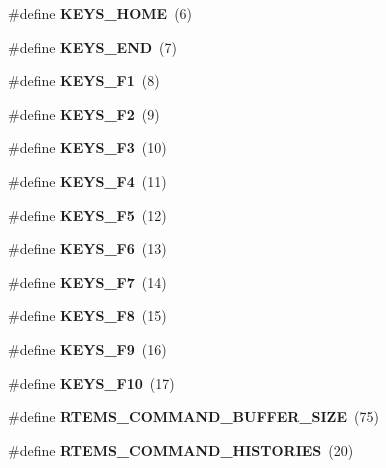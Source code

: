 \begin{DoxyCompactItemize}
\#define {\bfseries K\+E\+Y\+S\+\_\+\+H\+O\+ME}~(6)
\item 
\mbox{\label{mon-editor_8c_a2dfe5eb52c2dddf8574639989b868476}} 
\#define {\bfseries K\+E\+Y\+S\+\_\+\+E\+ND}~(7)
\item 
\mbox{\label{mon-editor_8c_ac4cd322a4df46499e2fc9f85316cc8cc}} 
\#define {\bfseries K\+E\+Y\+S\+\_\+\+F1}~(8)
\item 
\mbox{\label{mon-editor_8c_aa578077c29d48d67146d89bfb509bc6e}} 
\#define {\bfseries K\+E\+Y\+S\+\_\+\+F2}~(9)
\item 
\mbox{\label{mon-editor_8c_a3484e57321a09eea2db6b1514ba6273d}} 
\#define {\bfseries K\+E\+Y\+S\+\_\+\+F3}~(10)
\item 
\mbox{\label{mon-editor_8c_a44289fca47aa6767201286316853509b}} 
\#define {\bfseries K\+E\+Y\+S\+\_\+\+F4}~(11)
\item 
\mbox{\label{mon-editor_8c_a56c5dfec171dc0bff08bc63398441b1c}} 
\#define {\bfseries K\+E\+Y\+S\+\_\+\+F5}~(12)
\item 
\mbox{\label{mon-editor_8c_a734f7bfeedaaaf1c5d9bbd85b64cd785}} 
\#define {\bfseries K\+E\+Y\+S\+\_\+\+F6}~(13)
\item 
\mbox{\label{mon-editor_8c_a52cfb457633899daea53aa7935acea8b}} 
\#define {\bfseries K\+E\+Y\+S\+\_\+\+F7}~(14)
\item 
\mbox{\label{mon-editor_8c_a40391e40ec030d3dab9dd56c2f798ba9}} 
\#define {\bfseries K\+E\+Y\+S\+\_\+\+F8}~(15)
\item 
\mbox{\label{mon-editor_8c_a15344ee2d43deac4a48bd64f127256f9}} 
\#define {\bfseries K\+E\+Y\+S\+\_\+\+F9}~(16)
\item 
\mbox{\label{mon-editor_8c_aa81e303f27e8cd622a9f8a96883f62ed}} 
\#define {\bfseries K\+E\+Y\+S\+\_\+\+F10}~(17)
\item 
\mbox{\label{mon-editor_8c_a1c212c859799e2f51e42eefd2b5e37d8}} 
\#define {\bfseries R\+T\+E\+M\+S\+\_\+\+C\+O\+M\+M\+A\+N\+D\+\_\+\+B\+U\+F\+F\+E\+R\+\_\+\+S\+I\+ZE}~(75)
\item 
\mbox{\label{mon-editor_8c_a402717acedb6202380b365a8be46c4fd}} 
\#define {\bfseries R\+T\+E\+M\+S\+\_\+\+C\+O\+M\+M\+A\+N\+D\+\_\+\+H\+I\+S\+T\+O\+R\+I\+ES}~(20)
\end{DoxyCompactItemize}
